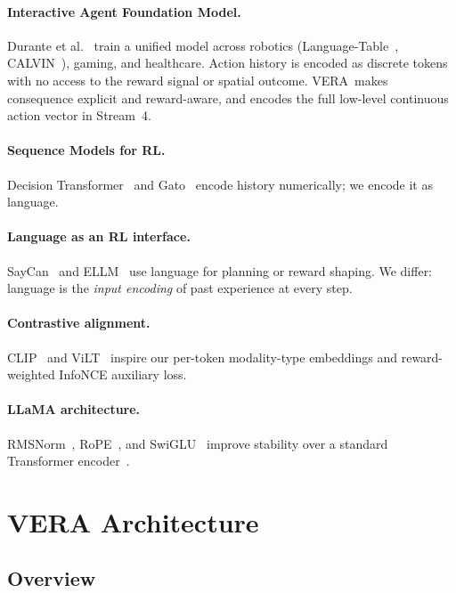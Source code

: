 \documentclass{article}
\newcommand{\modelname}{\textsc{VERA}\xspace}
\begin{document}
\paragraph{Interactive Agent Foundation Model.}
Durante et al.~\citep{durante2024agent} train a unified model across
robotics (Language-Table~\citep{lynch2023languagetable},
CALVIN~\citep{mees2022calvin}), gaming, and healthcare.
Action history is encoded as discrete tokens with no access to the reward
signal or spatial outcome.
\modelname\ makes consequence explicit and reward-aware, and
encodes the full low-level continuous action vector in Stream~4.

\paragraph{Sequence Models for RL.}
Decision Transformer~\citep{chen2021decision} and Gato~\citep{reed2022gato}
encode history numerically; we encode it as language.

\paragraph{Language as an RL interface.}
SayCan~\citep{ahn2022saycan} and ELLM~\citep{du2023ellm} use language for
planning or reward shaping.
We differ: language is the \emph{input encoding} of past experience at
every step.

\paragraph{Contrastive alignment.}
CLIP~\citep{radford2021clip} and ViLT~\citep{kim2021vilt} inspire our
per-token modality-type embeddings and reward-weighted InfoNCE auxiliary loss.

\paragraph{LLaMA architecture.}
RMSNorm~\citep{zhang2019rmsnorm}, RoPE~\citep{su2021rope}, and
SwiGLU~\citep{shazeer2020swiglu} improve stability over a standard
Transformer encoder~\citep{vaswani2017attention}.

\section{VERA Architecture}
\label{sec:model}

\subsection{Overview}
\end{document}
